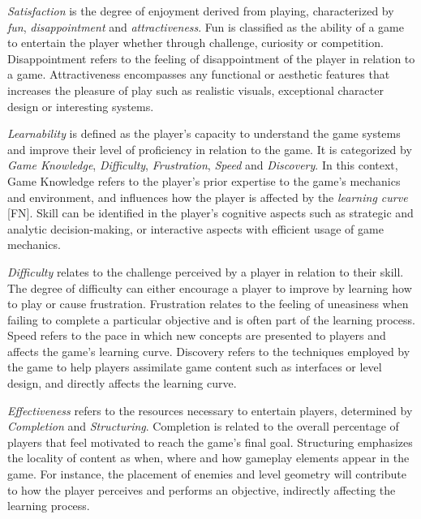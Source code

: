 \emph{Satisfaction} is the degree of enjoyment derived from playing, characterized by \emph{fun}, \emph{disappointment} and \emph{attractiveness}. Fun is classified as the ability of a game to entertain the player whether through challenge, curiosity or competition. Disappointment refers to the feeling of disappointment of the player in relation to a game. Attractiveness encompasses any functional or aesthetic features that increases the pleasure of play such as realistic visuals, exceptional character design or interesting systems.

\emph{Learnability} is defined as the player's capacity to understand the game systems and improve their level of proficiency in relation to the game. It is categorized by \emph{Game Knowledge}, \emph{Difficulty}, \emph{Frustration}, \emph{Speed} and \emph{Discovery}. In this context, Game Knowledge refers to the player's prior expertise to the game's mechanics and environment, and influences how the player is affected by the \emph{learning curve} [FN]. Skill can be identified in the player's cognitive aspects such as strategic and analytic decision-making, or interactive aspects with efficient usage of game mechanics.

\emph{Difficulty} relates to the challenge perceived by a player in relation to their skill. The degree of difficulty can either encourage a player to improve by learning how to play or cause frustration. Frustration relates to the feeling of uneasiness when failing to complete a particular objective and is often part of the learning process. Speed refers to the pace in which new concepts are presented to players and affects the game's learning curve. Discovery refers to the techniques employed by the game to help players assimilate game content such as interfaces or level design, and directly affects the learning curve.

\emph{Effectiveness} refers to the resources necessary to entertain players, determined by \emph{Completion} and \emph{Structuring}. Completion is related to the overall percentage of players that feel motivated to reach the game's final goal. Structuring emphasizes the locality of content as when, where and how gameplay elements appear in the game. For instance, the placement of enemies and level geometry will contribute to how the player perceives and performs an objective, indirectly affecting the learning process.


